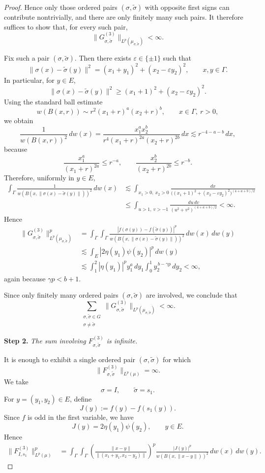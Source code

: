 \documentclass[12pt]{amsart}
\begin{document}
\begin{proof}
Hence only those ordered pairs \((\sigma,\tilde{\sigma})\) with opposite first signs can contribute nontrivially, and there are only finitely many such pairs. It therefore suffices to show that, for every such pair,
\[
\|G_{\sigma,\tilde{\sigma}}^{(3)}\|_{L^p(\mu_{\sigma,\tilde{\sigma}})}<\infty.
\]

Fix such a pair \((\sigma,\tilde{\sigma})\). Then there exists \(\varepsilon\in\{\pm 1\}\) such that
\[
\|\sigma(x)-\tilde{\sigma}(y)\|^2
=
(x_1+y_1)^2+(x_2-\varepsilon y_2)^2,
\qquad x,y\in \Gamma.
\]
In particular, for \(y\in E\),
\[
\|\sigma(x)-\tilde{\sigma}(y)\|^2
\ge
(x_1+1)^2+(x_2-\varepsilon y_2)^2.
\]
Using the standard ball estimate
\[
w(B(x,r))\sim r^2(x_1+r)^a(x_2+r)^b,
\qquad x\in \Gamma,\ r>0,
\]
we obtain
\[
\frac{1}{w(B(x,r))^2}\,dw(x)
=
\frac{x_1^a x_2^b}{r^4(x_1+r)^{2a}(x_2+r)^{2b}}\,dx
\lesssim
r^{-4-a-b}\,dx,
\]
because
\[
\frac{x_1^a}{(x_1+r)^{2a}}\le r^{-a},
\qquad
\frac{x_2^b}{(x_2+r)^{2b}}\le r^{-b}.
\]
Therefore, uniformly in \(y\in E\),
\begin{align*}
\int_\Gamma \frac{1}{w(B(x,\|\sigma(x)-\tilde{\sigma}(y)\|))^2}\,dw(x)
&\lesssim
\int_{x_1>0,\ x_2>0}
\frac{dx}
{\bigl((x_1+1)^2+(x_2-\varepsilon y_2)^2\bigr)^{(4+a+b)/2}} \\
&\le
\int_{u>1,\ v>-1}
\frac{du\,dv}{(u^2+v^2)^{(4+a+b)/2}}
<\infty.
\end{align*}
Hence
\begin{align*}
\|G_{\sigma,\tilde{\sigma}}^{(3)}\|_{L^p(\mu_{\sigma,\tilde{\sigma}})}^p
&=
\int_\Gamma\int_\Gamma
\frac{|f(\sigma(y))-f(\tilde{\sigma}(y))|^p}
{w(B(x,\|\sigma(x)-\tilde{\sigma}(y)\|))^2}
\,dw(x)\,dw(y) \\
&\lesssim
\int_E |2\eta(y_1)\psi(y_2)|^p\,dw(y) \\
&\lesssim
\int_1^2 |\eta(y_1)|^p y_1^a\,dy_1
\int_0^1 y_2^{\,b-\gamma p}\,dy_2
<\infty,
\end{align*}
again because \(\gamma p<b+1\).

Since only finitely many ordered pairs \((\sigma,\tilde{\sigma})\) are involved, we conclude that
\[
\sum_{\substack{\sigma,\tilde{\sigma}\in G\\ \sigma\neq \tilde{\sigma}}}
\|G_{\sigma,\tilde{\sigma}}^{(3)}\|_{L^p(\mu_{\sigma,\tilde{\sigma}})}
<\infty.
\]

\medskip

\noindent
\textbf{Step 2.}
\emph{The sum involving \(F_{\sigma,\tilde{\sigma}}^{(3)}\) is infinite.}

It is enough to exhibit a single ordered pair \((\sigma,\tilde{\sigma})\) for which
\[
\|F_{\sigma,\tilde{\sigma}}^{(3)}\|_{L^p(\mu)}=\infty.
\]
We take
\[
\sigma=I,\qquad \tilde{\sigma}=s_1.
\]
For \(y=(y_1,y_2)\in E\), define
\[
J(y):=f(y)-f(s_1(y)).
\]
Since \(f\) is odd in the first variable, we have
\[
J(y)=2\eta(y_1)\psi(y_2),\qquad y\in E.
\]
Hence
\begin{align*}
\|F_{I,s_1}^{(3)}\|_{L^p(\mu)}^p
&=
\int_\Gamma\int_\Gamma
\left(\frac{\|x-y\|}{\|(x_1+y_1,x_2-y_2)\|}\right)^p
\frac{|J(y)|^p}{w(B(x,\|x-y\|))^2}
\,dw(x)\,dw(y).
\end{align*}


\end{proof}
\end{document}
